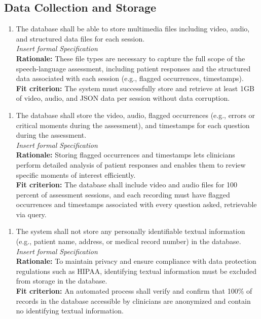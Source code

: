 \documentclass[12pt]{article}
\begin{document}
\subsection{Data Collection and Storage}
\begin{enumerate}[{FR-DSC}1. ]
  \item The database shall be able to store multimedia files including video, audio, and structured data files for each session.\\
  \textit{Insert formal Specification}\\
  \textbf{Rationale: }These file types are necessary to capture the full scope of the speech-language assessment, 
  including patient responses and the structured data associated with each session (e.g., flagged occurrences, 
  timestamps).\\
  \textbf{Fit criterion: }The system must successfully store and retrieve at least 1GB of video, audio, and JSON 
  data per session without data corruption.
\end{enumerate}
\begin{enumerate}[{FR-DSC}2. ]
  \item The database shall store the video, audio, flagged occurrences (e.g., errors or critical moments
  during the assessment), and timestamps for each question during the assessment.\\
 \textit{Insert formal Specification}\\
 \textbf{Rationale: }Storing flagged occurrences and timestamps lets clinicians perform detailed analysis 
 of patient responses and enables them to review specific moments of interest efficiently.\\
 \textbf{Fit criterion: }The database shall include video and audio files for 100 percent of assessment sessions,
  and each recording must have flagged occurrences and timestamps associated with every question asked, 
  retrievable via query.
\end{enumerate}
\begin{enumerate}[{FR-DSC}3. ]
  \item The system shall not store any personally identifiable textual information (e.g., patient name, address, 
  or medical record number) in the database.\\
  \textit{Insert formal Specification}\\
  \textbf{Rationale: }To maintain privacy and ensure compliance with data protection regulations such as HIPAA, 
  identifying textual information must be excluded from storage in the database.\\
  \textbf{Fit criterion: }An automated process shall verify and confirm that 100\% of records in the database 
  accessible by clinicians are anonymized and contain no identifying textual information.
\end{enumerate}
\end{document}

